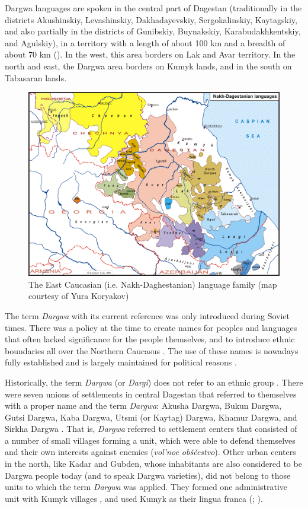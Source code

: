 Dargwa languages are spoken in the central part of Dagestan (traditionally in the districts Akushinskiy, Levashinskiy, Dakhadayevskiy, Sergokalinskiy, Kaytagskiy, and also partially in the districts of Gunibskiy, Buynakskiy, Karabudakhkentskiy, and Agulskiy), in a territory with a length of about 100 km and a breadth of about 70 km (). In the west, this area borders on Lak and Avar territory. In the north and east, the Dargwa area borders on Kumyk lands, and in the south on Tabasaran lands.


\begin{figure}[t!]
	\caption{The East Caucasian (i.e. Nakh-Daghestanian) language family (map courtesy of Yura Koryakov)}
	\label{fig:Map 3}
	\includegraphics[scale=0.6, angle =90]{figures/NEC_color_2016.png}
\end{figure}

The term \textit{Dargwa} with its current reference was only introduced during Soviet times. There was a policy at the time to create names for peoples and languages that often lacked significance for the people themselves, and to introduce ethnic boundaries all over the Northern Caucasus \citep[114]{Grenoble2003}. The use of these names is nowadays fully established and is largely maintained for political reasons \citep{Shaxbanov2009}.

Historically, the term \textit{Dargwa} (or \textit{Dargi}) does not refer to an ethnic group \citep[13]{Abdullaev1954}. There were seven unions of settlements in central Dagestan that referred to themselves with a proper name and the term \textit{Dargwa}: Akusha Dargwa, Bukun Dargwa, Gutsi Dargwa, Kaba Dargwa, Utsmi (or Kaytag) Dargwa, Khamur Dargwa, and Sirkha Dargwa \citep[13]{Magomedov1999}. That is, \textit{Dargwa} referred to settlement centers that consisted of a number of small villages forming a unit, which were able to defend themselves and their own interests against enemies (\textit{vol'noe obščestvo}). Other urban centers in the north, like Kadar and Gubden, whose inhabitants are also considered to be Dargwa people today (and to speak Dargwa varieties), did not belong to those units to which the term \textit{Dargwa} was applied. They formed one administrative unit with Kumyk villages \citep[12]{Abdullaev1954}, and used Kumyk as their lingua franca (\citealt{DobrushinaDanielKoryakov}; \citealt[58]{Wixman1980}). 


